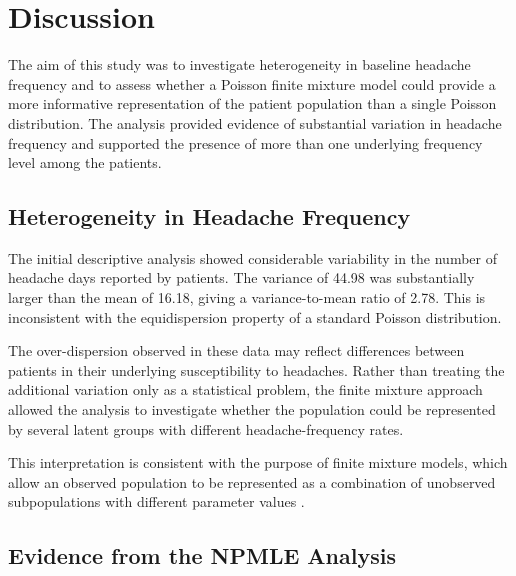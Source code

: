 
\section{Discussion}
\label{sec:discussion}

The aim of this study was to investigate heterogeneity in baseline
headache frequency and to assess whether a Poisson finite mixture
model could provide a more informative representation of the patient
population than a single Poisson distribution. The analysis provided
evidence of substantial variation in headache frequency and supported
the presence of more than one underlying frequency level among the
patients.

\subsection{Heterogeneity in Headache Frequency}

The initial descriptive analysis showed considerable variability in
the number of headache days reported by patients. The variance of
44.98 was substantially larger than the mean of 16.18, giving a
variance-to-mean ratio of 2.78. This is inconsistent with the
equidispersion property of a standard Poisson distribution.

The over-dispersion observed in these data may reflect differences
between patients in their underlying susceptibility to headaches.
Rather than treating the additional variation only as a statistical
problem, the finite mixture approach allowed the analysis to
investigate whether the population could be represented by several
latent groups with different headache-frequency rates.

This interpretation is consistent with the purpose of finite mixture
models, which allow an observed population to be represented as a
combination of unobserved subpopulations with different parameter
values \citep{McLachlanPeel2000}.

\subsection{Evidence from the NPMLE Analysis}

